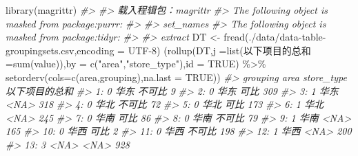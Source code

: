 \documentclass[
]{book}
\newenvironment{Shaded}{\begin{snugshade}}{\end{snugshade}}
\newcommand{\AttributeTok}[1]{\textcolor[rgb]{0.77,0.63,0.00}{#1}}
\newcommand{\CommentTok}[1]{\textcolor[rgb]{0.56,0.35,0.01}{\textit{#1}}}
\newcommand{\ConstantTok}[1]{\textcolor[rgb]{0.00,0.00,0.00}{#1}}
\newcommand{\FunctionTok}[1]{\textcolor[rgb]{0.00,0.00,0.00}{#1}}
\newcommand{\NormalTok}[1]{#1}
\newcommand{\OtherTok}[1]{\textcolor[rgb]{0.56,0.35,0.01}{#1}}
\newcommand{\SpecialCharTok}[1]{\textcolor[rgb]{0.00,0.00,0.00}{#1}}
\newcommand{\StringTok}[1]{\textcolor[rgb]{0.31,0.60,0.02}{#1}}
\begin{document}
\begin{Shaded}
\begin{Highlighting}[]
\FunctionTok{library}\NormalTok{(magrittr)}
\CommentTok{\#\textgreater{} }
\CommentTok{\#\textgreater{} 载入程辑包：\textquotesingle{}magrittr\textquotesingle{}}
\CommentTok{\#\textgreater{} The following object is masked from \textquotesingle{}package:purrr\textquotesingle{}:}
\CommentTok{\#\textgreater{} }
\CommentTok{\#\textgreater{}     set\_names}
\CommentTok{\#\textgreater{} The following object is masked from \textquotesingle{}package:tidyr\textquotesingle{}:}
\CommentTok{\#\textgreater{} }
\CommentTok{\#\textgreater{}     extract}
\NormalTok{DT }\OtherTok{\textless{}{-}} \FunctionTok{fread}\NormalTok{(}\StringTok{\textquotesingle{}./data/data{-}table{-}groupingsets.csv\textquotesingle{}}\NormalTok{,}\AttributeTok{encoding =} \StringTok{\textquotesingle{}UTF{-}8\textquotesingle{}}\NormalTok{)}
\NormalTok{(}\FunctionTok{rollup}\NormalTok{(DT,}\AttributeTok{j =}\FunctionTok{list}\NormalTok{(以下项目的总和 }\OtherTok{=}\FunctionTok{sum}\NormalTok{(value)),}\AttributeTok{by =} \FunctionTok{c}\NormalTok{(}\StringTok{"area"}\NormalTok{,}\StringTok{"store\_type"}\NormalTok{),}\AttributeTok{id =} \ConstantTok{TRUE}\NormalTok{) }\SpecialCharTok{\%\textgreater{}\%} \FunctionTok{setorderv}\NormalTok{(}\AttributeTok{cols=}\FunctionTok{c}\NormalTok{(}\StringTok{\textquotesingle{}area\textquotesingle{}}\NormalTok{,}\StringTok{\textquotesingle{}grouping\textquotesingle{}}\NormalTok{),}\AttributeTok{na.last =} \ConstantTok{TRUE}\NormalTok{))}
\CommentTok{\#\textgreater{}     grouping area store\_type 以下项目的总和}
\CommentTok{\#\textgreater{}  1:        0 华东     不可比              9}
\CommentTok{\#\textgreater{}  2:        0 华东       可比            309}
\CommentTok{\#\textgreater{}  3:        1 华东       \textless{}NA\textgreater{}            318}
\CommentTok{\#\textgreater{}  4:        0 华北     不可比             72}
\CommentTok{\#\textgreater{}  5:        0 华北       可比            173}
\CommentTok{\#\textgreater{}  6:        1 华北       \textless{}NA\textgreater{}            245}
\CommentTok{\#\textgreater{}  7:        0 华南       可比             86}
\CommentTok{\#\textgreater{}  8:        0 华南     不可比             79}
\CommentTok{\#\textgreater{}  9:        1 华南       \textless{}NA\textgreater{}            165}
\CommentTok{\#\textgreater{} 10:        0 华西       可比              2}
\CommentTok{\#\textgreater{} 11:        0 华西     不可比            198}
\CommentTok{\#\textgreater{} 12:        1 华西       \textless{}NA\textgreater{}            200}
\CommentTok{\#\textgreater{} 13:        3 \textless{}NA\textgreater{}       \textless{}NA\textgreater{}            928}
\end{Highlighting}
\end{Shaded}
\end{document}
